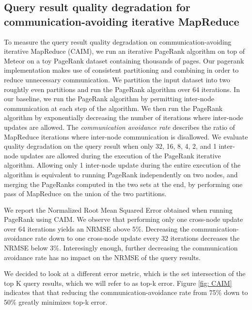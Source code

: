 \subsection{Query result quality degradation for communication-avoiding iterative MapReduce}

To measure the query result quality degradation on communication-avoiding iterative MapReduce (CAIM), we run an iterative PageRank algorithm on top of Meteor on a toy PageRank dataset containing thousands of pages. Our pagerank implementation makes use of consistent partitioning and combining in order to reduce unnecessary communication. We partition the input dataset into two roughtly even partitions and run the PageRank algorithm over 64 iterations. In our baseline, we run the PageRank algorithm by permitting inter-node communication at each step of the algorithm. We then run the PageRank algorithm by exponentially decreasing the number of iterations where inter-node updates are allowed. The \emph{communication avoidance rate} describes the ratio of MapReduce iterations where inter-node communication is disallowed. We evaluate quality degradation on the query result when only 32, 16, 8, 4, 2, and 1 inter-node updates are allowed during the execution of the PageRank iterative algorithm. Allowing only 1 inter-node update during the entire execution of the algorithm is equivalent to running PageRank independently on two nodes, and merging the PageRanks computed in the two sets at the end, by performing one pass of MapReduce on the union of the two partitions. 

We report the Normalized Root Mean Squared Error obtained when running PageRank using CAIM. We observe that performing only one cross-node update over 64 iterations yields an NRMSE above 5\%. Decreasing the communication-avoidance rate down to one cross-node update every 32 iterations decreases the NRMSE below 3\%. Interesingly enough, further decreasing the communication avoidance rate has no impact on the NRMSE of the query results. 

We decided to look at a different error metric, which is the set intersection of the top K query results, which we will refer to as top-k error. Figure \ref{fig: CAIM} indicates that that reducing the communication-avoidance rate from 75\% down to 50\% greatly minimizes top-k error.

